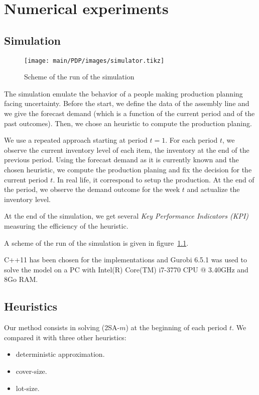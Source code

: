 \chapter{Numerical experiments}
\label{chap:PDP:numerical-experiments}



\section{Simulation}


\begin{figure}[h]
  \centering
  \texttt{[image: main/PDP/images/simulator.tikz]}
  \caption{Scheme of the run of the simulation}
  \label{fig:simulator}
\end{figure}

The simulation emulate the behavior of a people making production planning facing uncertainty. Before the start, we define the data of the assembly line and we give the forecast demand (which is a function of the current period and of the past outcomes). Then, we chose an heuristic to compute the production planing.

We use a repeated approach starting at period $t=1$. For each period $t$, we observe the current inventory level of each item, \ie the inventory at the end of the previous period. Using the forecast demand as it is currently known and the chosen heuristic, we compute the production planing and fix the decision for the current period $t$. In real life, it correspond to setup the production. At the end of the period, we observe the demand outcome for the week $t$ and actualize the inventory level.

At the end of the simulation, we get several \emph{Key Performance Indicators (KPI)} measuring the efficiency of the heuristic.

A scheme of the run of the simulation is given in figure~\ref{fig:simulator}.



C++11 has been chosen for the implementations and Gurobi 6.5.1 was used to solve the model on a PC with Intel(R) Core(TM) i7-3770 CPU @ 3.40GHz and 8Go RAM.




\section{Heuristics}


Our method consists in solving (2SA-$m$) at the beginning of each period $t$. We compared it with three other heuristics:
\begin{itemize}
  \item deterministic approximation.
  \item cover-size.
  \item lot-size.
\end{itemize}


